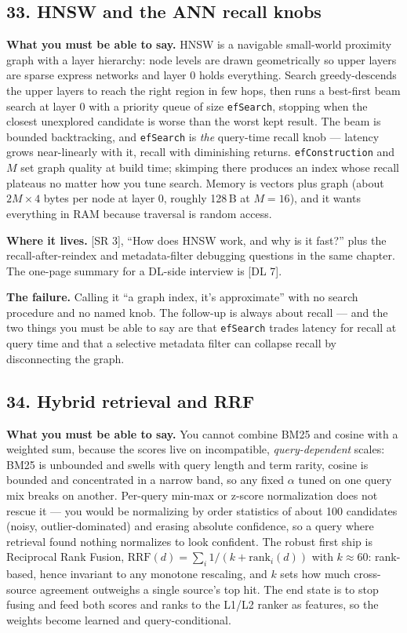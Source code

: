 \subsection*{33. HNSW and the ANN recall knobs}

\textbf{What you must be able to say.} HNSW is a navigable small-world proximity graph with a layer hierarchy: node levels are drawn geometrically so upper layers are sparse express networks and layer 0 holds everything. Search greedy-descends the upper layers to reach the right region in few hops, then runs a best-first beam search at layer 0 with a priority queue of size \texttt{efSearch}, stopping when the closest unexplored candidate is worse than the worst kept result. The beam is bounded backtracking, and \texttt{efSearch} is \emph{the} query-time recall knob --- latency grows near-linearly with it, recall with diminishing returns. \texttt{efConstruction} and $M$ set graph quality at build time; skimping there produces an index whose recall plateaus no matter how you tune search. Memory is vectors plus graph (about $2M \times 4$ bytes per node at layer 0, roughly 128\,B at $M = 16$), and it wants everything in RAM because traversal is random access.

\textbf{Where it lives.} [SR 3], ``How does HNSW work, and why is it fast?'' plus the recall-after-reindex and metadata-filter debugging questions in the same chapter. The one-page summary for a DL-side interview is [DL 7].

\textbf{The failure.} Calling it ``a graph index, it's approximate'' with no search procedure and no named knob. The follow-up is always about recall --- and the two things you must be able to say are that \texttt{efSearch} trades latency for recall at query time and that a selective metadata filter can collapse recall by disconnecting the graph.

\subsection*{34. Hybrid retrieval and RRF}

\textbf{What you must be able to say.} You cannot combine BM25 and cosine with a weighted sum, because the scores live on incompatible, \emph{query-dependent} scales: BM25 is unbounded and swells with query length and term rarity, cosine is bounded and concentrated in a narrow band, so any fixed $\alpha$ tuned on one query mix breaks on another. Per-query min-max or z-score normalization does not rescue it --- you would be normalizing by order statistics of about 100 candidates (noisy, outlier-dominated) and erasing absolute confidence, so a query where retrieval found nothing normalizes to look confident. The robust first ship is Reciprocal Rank Fusion, $\mathrm{RRF}(d) = \sum_i 1/(k + \mathrm{rank}_i(d))$ with $k \approx 60$: rank-based, hence invariant to any monotone rescaling, and $k$ sets how much cross-source agreement outweighs a single source's top hit. The end state is to stop fusing and feed both scores and ranks to the L1/L2 ranker as features, so the weights become learned and query-conditional.

